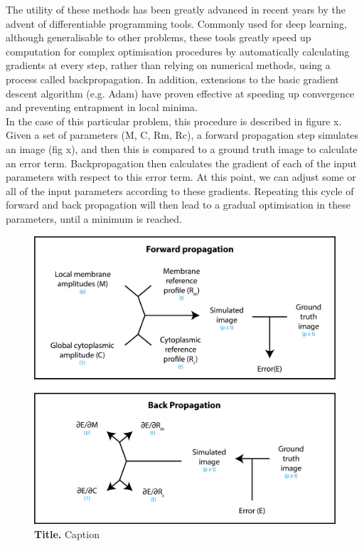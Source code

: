 \documentclass[12pt]{"article"}
\newcommand{\mycaption}[2]{\caption[#1]{\textbf{#1.} #2}}
\begin{document}
The utility of these methods has been greatly advanced in recent years by the advent of differentiable programming tools. Commonly used for deep learning, although generalisable to other problems, these tools greatly speed up computation for complex optimisation procedures by automatically calculating gradients at every step, rather than relying on numerical methods, using a process called backpropagation. In addition, extensions to the basic gradient descent algorithm (e.g. Adam) have proven effective at speeding up convergence and preventing entrapment in local minima. \\

In the case of this particular problem, this procedure is described in figure x. Given a set of parameters (M, C, Rm, Rc), a forward propagation step simulates an image (fig x), and then this is compared to a ground truth image to calculate an error term. Backpropagation then calculates the gradient of each of the input parameters with respect to this error term. At this point, we can adjust some or all of the input parameters according to these gradients. Repeating this cycle of forward and back propagation will then lead to a gradual optimisation in these parameters, until a minimum is reached. \\

\begin{figure}[!h]
\includegraphics[scale=1.1]{memquant_forward_and_back_propagation}
\setlength{\abovecaptionskip}{20pt}
\centering
\mycaption{Title}{Caption}
\end{figure}
\end{document}
